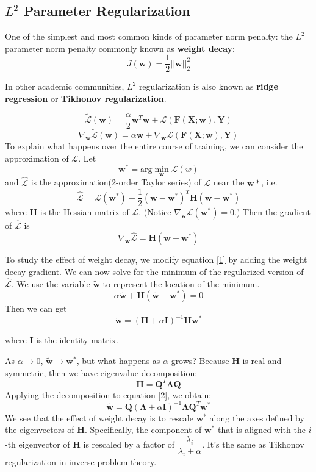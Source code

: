 \documentclass{article}
\begin{document}
		
		\subsection{$L^2$ Parameter Regularization}
	
		
		One of the simplest and most common kinds of parameter norm penalty: the $L^2$ parameter norm penalty commonly known as \textbf{weight decay}:
		$$
		J(\bm w) = \dfrac{1}{2}||\bm w||_2^2
		$$
		
		In other academic communities, $L^2$ regularization is also known as \textbf{ridge regression} or \textbf{Tikhonov regularization}.
		
		$$
		\tilde{\mathcal{L}} (\bm w) = \dfrac{\alpha}{2} {\bm w}^T\bm w + \mathcal L(\bm F(\bm X;\bm w),\bm Y)
		$$
		$$
		\nabla_{\bm w}\tilde{\mathcal{L}} (\bm w) = \alpha\bm w + \nabla_{\bm w} \mathcal L(\bm F(\bm X;\bm w),\bm Y)
		$$
			To explain what happens over the entire course of training, we can consider the approximation of $\mathcal L$. Let
			$$
				\bm w^*= \text{arg} \min_{\bm w} \mathcal{L}(w)
			$$
			and $\hat{\mathcal{L}}$ is the approximation(2-order Taylor series) of $\mathcal L$ near the $\bm w*$, i.e. 
			$$
				\hat{\mathcal{L}} = \mathcal{L}(\bm w^*) + \dfrac{1}{2}(\bm w - \bm w^*)^T\bm H(\bm w - \bm w^*)
			$$
			where $\bm H$ is the Hessian matrix of $\mathcal{L}$. (Notice $\nabla_{\bm w}\mathcal{L}(\bm w^*)=0$.)
			Then the gradient of $\hat{\mathcal{L}}$ is 
			\begin{equation}\label{1}
				\nabla_{\bm w} \hat{\mathcal{L}} = \bm H(\bm w - \bm w^*)
			\end{equation}
				
			To study the effect of weight decay, we modify equation \eqref{1} by adding the
			weight decay gradient. We can now solve for the minimum of the regularized
			version of $\hat{\mathcal{L}}$. We use the variable $\tilde{\bm w}$ to represent the location of the minimum.
			$$
			\alpha \tilde{\bm w} + \bm H(\tilde{\bm w} - \bm w^*)=0
			$$
			Then we can get
			\begin{equation}\label{2}
				\tilde{\bm w} = (\bm H + \alpha \bm I)^{-1}\bm H \bm w^*
			\end{equation}
			
			where $\bm I$ is the identity matrix.
	
			As $\alpha \rightarrow 0$, $\tilde{\bm w}\rightarrow \bm w^*$, but what happens as $\alpha$ grows? Because	$\bm H$	is real and symmetric, then we have eigenvalue decomposition:
			$$ \bm H = \bm Q^T \bm \Lambda \bm Q$$
			Applying the decomposition to equation \eqref{2}, we obtain:
			$$
			\tilde{\bm w} = \bm Q(\bm \Lambda +\alpha \bm I)^{-1}\bm \Lambda \bm Q^T \bm w^*
			$$
			We see that the effect of weight decay is to rescale $\bm w^*$ along the axes defined by the eigenvectors of $\bm H$. Specifically, the component of
			$\bm w^*$ that is aligned with the $i$-th eigenvector of $\bm H$ is rescaled by a factor of	$\dfrac{\lambda_i}{\lambda_i+\alpha}$. It's the same as Tikhonov regularization in inverse problem theory.
\end{document}
